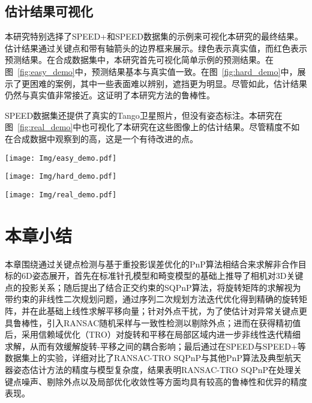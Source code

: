 \subsection{估计结果可视化}

本研究特别选择了SPEED+和SPEED数据集的示例来可视化本研究的最终结果。估计结果通过关键点和带有轴箭头的边界框来展示。绿色表示真实值，而红色表示预测结果。在合成数据集中，本研究首先可视化简单示例的预测结果。在图~\ref{fig:easy_demo}中，预测结果基本与真实值一致。在图~\ref{fig:hard_demo}中，展示了更困难的案例，其中一些表面难以辨别，遮挡更为明显。尽管如此，估计结果仍然与真实值非常接近。这证明了本研究方法的鲁棒性。

SPEED数据集还提供了真实的Tango卫星照片，但没有姿态标注。本研究在图~\ref{fig:real_demo}中也可视化了本研究在这些图像上的估计结果。尽管精度不如在合成数据中观察到的高，这是一个有待改进的点。

\begin{figure*}[!t] \centering \texttt{[image: Img/easy\_demo.pdf]} \caption{SPEED+合成图像估计结果可视化的简单示例} \label{fig:easy_demo} \end{figure*}

\begin{figure*}[!t] \centering \texttt{[image: Img/hard\_demo.pdf]} \caption{SPEED+合成图像估计结果可视化的困难示例} \label{fig:hard_demo} \end{figure*}

\begin{figure*}[htbp] \centering \texttt{[image: Img/real\_demo.pdf]} \caption{在SPEED真实图像上的6D估计结果的实际示例} \label{fig:real_demo} \end{figure*}


\section{本章小结}
\label{sec:RANSAC-TRO-SQPnP:summary}
本章围绕通过关键点检测与基于重投影误差优化的PnP算法相结合来求解非合作目标的6D姿态展开，首先在标准针孔模型和畸变模型的基础上推导了相机对3D关键点的投影关系；随后提出了结合正交约束的SQPnP算法，将旋转矩阵的求解视为带约束的非线性二次规划问题，通过序列二次规划方法迭代优化得到精确的旋转矩阵，并在此基础上线性求解平移向量；针对外点干扰，为了使估计对异常关键点更具鲁棒性，引入RANSAC随机采样与一致性检测以剔除外点；进而在获得精初值后，采用信赖域优化（TRO）对旋转和平移在局部区域内进一步非线性迭代精细求解，从而有效缓解旋转-平移之间的耦合影响；最后通过在SPEED与SPEED+等数据集上的实验，详细对比了RANSAC-TRO SQPnP与其他PnP算法及典型航天器姿态估计方法的精度与模型复杂度，结果表明RANSAC-TRO SQPnP在处理关键点噪声、剔除外点以及局部优化收敛性等方面均具有较高的鲁棒性和优异的精度表现。
